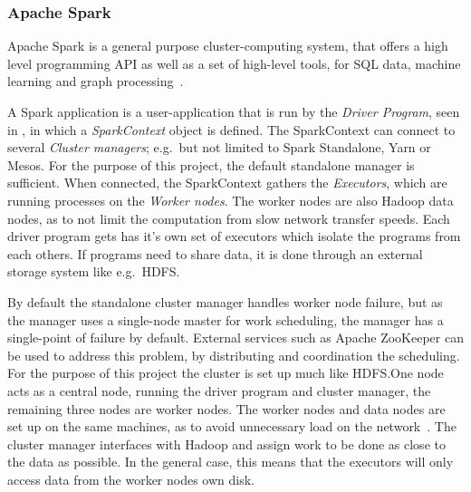 \subsubsection{Apache Spark}\label{sec:spark}
Apache Spark is a general purpose cluster-computing system, that offers a high level programming API as well as a set of high-level tools, for SQL data, machine learning and graph processing~\cite{sparkintro}.

A Spark application is a user-application that is run by the \emph{Driver Program}, seen in , in which a \emph{SparkContext} object is defined. The SparkContext can connect to several \emph{Cluster managers}; e.g.\ but not limited to Spark Standalone, Yarn or Mesos. For the purpose of this project, the default standalone manager is sufficient. When connected, the SparkContext gathers the \emph{Executors}, which are running processes on the \emph{Worker nodes}. The worker nodes are also Hadoop data nodes, as to not limit the computation from slow network transfer speeds. Each driver program gets has it's own set of executors which isolate the programs from each others. If programs need to share data, it is done through an external storage system like e.g.\ HDFS.\@

By default the standalone cluster manager handles worker node failure, but as the manager uses a single-node master for work scheduling, the manager has a single-point of failure by default. External services such as Apache ZooKeeper can be used to address this problem, by distributing and coordination the scheduling. For the purpose of this project the cluster is set up much like HDFS.\@ One node acts as a central node, running the driver program and cluster manager, the remaining three nodes are worker nodes. The worker nodes and data nodes are set up on the same machines, as to avoid unnecessary load on the network~\cite{sparkcluster}. The cluster manager interfaces with Hadoop and assign work to be done as close to the data as possible. In the general case, this means that the executors will only access data from the worker nodes own disk. %


